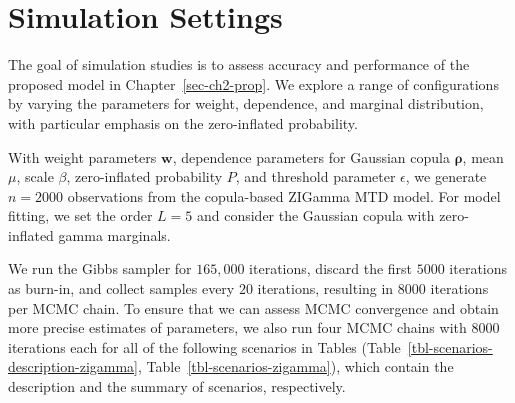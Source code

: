 \documentclass[
  letterpaper,
  double,
  12pt,
  1.0in]{beavtex}
\begin{document}
\section{Simulation Settings}\label{simulation-settings-1}

The goal of simulation studies is to assess accuracy and performance of
the proposed model in Chapter~\ref{sec-ch2-prop}. We explore a range of
configurations by varying the parameters for weight, dependence, and
marginal distribution, with particular emphasis on the zero-inflated
probability.

With weight parameters \(\boldsymbol{w}\), dependence parameters for
Gaussian copula \(\boldsymbol{\rho}\), mean \(\mu\), scale \(\beta\),
zero-inflated probability \(P\), and threshold parameter \(\epsilon\),
we generate \(n = 2000\) observations from the copula-based ZIGamma MTD
model. For model fitting, we set the order \(L = 5\) and consider the
Gaussian copula with zero-inflated gamma marginals.

We run the Gibbs sampler for \(165,000\) iterations, discard the first
\(5000\) iterations as burn-in, and collect samples every \(20\)
iterations, resulting in \(8000\) iterations per MCMC chain. To ensure
that we can assess MCMC convergence and obtain more precise estimates of
parameters, we also run four MCMC chains with \(8000\) iterations each
for all of the following scenarios in Tables
(Table~\ref{tbl-scenarios-description-zigamma},
Table~\ref{tbl-scenarios-zigamma}), which contain the description and
the summary of scenarios, respectively.
\end{document}
